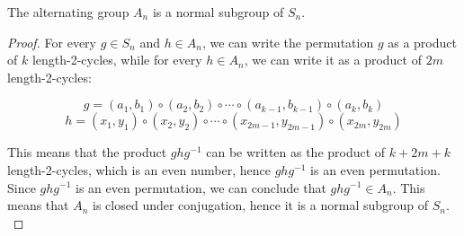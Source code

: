 \begin{lemma}
    The alternating group $A_n$ is a normal subgroup of $S_n$.
\end{lemma}
\begin{proof}
    For every $g \in S_n$ and $h \in A_n$, we can write the permutation $g$ as a product of
    $k$ length-2-cycles, while for every $h \in A_n$, we can write it as a product of $2m$ length-2-cycles:

    $$ g = (a_1, b_1) \circ (a_2, b_2) \circ \cdots \circ (a_{k-1}, b_{k-1}) 
    \circ (a_{k}, b_{k}) $$
    $$ h = (x_1, y_1) \circ (x_2, y_2) \circ \cdots \circ (x_{2m-1}, y_{2m-1}) 
    \circ (x_{2m}, y_{2m}) $$
    \vspace{0.2em}

    This means that the product $ghg^{-1}$ can be written as the product of $k + 2m + k$ 
    length-2-cycles, which is an even number, hence $ghg^{-1}$ is an even permutation. Since 
    $ghg^{-1}$ is an even permutation, we can conclude that $ghg^{-1} \in A_n$. This means that
    $A_n$ is closed under conjugation, hence it is a normal subgroup of $S_n$. \\
\end{proof} \vspace{0.2em}

\newpage

